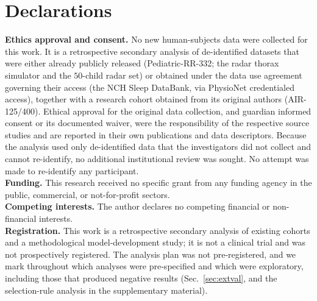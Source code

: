\documentclass[journal]{IEEEtran}
\begin{document}
\section*{Declarations}
\noindent\textbf{Ethics approval and consent.} No new human-subjects data were collected for this work. It
is a retrospective secondary analysis of de-identified datasets that were either already publicly released
(Pediatric-RR-332; the radar thorax simulator and the $50$-child radar set) or obtained under the data use
agreement governing their access (the NCH Sleep DataBank, via PhysioNet credentialed access), together with
a research cohort obtained from its original authors (AIR-125/400). Ethical approval for the original data
collection, and guardian informed consent or its documented waiver, were the responsibility of the
respective source studies and are reported in their own publications and data descriptors. Because the
analysis used only de-identified data that the investigators did not collect and cannot re-identify, no
additional institutional review was sought. No attempt was made to re-identify any participant.\\
\noindent\textbf{Funding.} This research received no specific grant from any funding agency in the public,
commercial, or not-for-profit sectors.\\
\noindent\textbf{Competing interests.} The author declares no competing financial or non-financial
interests.\\
\noindent\textbf{Registration.} This work is a retrospective secondary analysis of existing cohorts and a
methodological model-development study; it is not a clinical trial and was not prospectively registered.
The analysis plan was not pre-registered, and we mark throughout which analyses were pre-specified and
which were exploratory, including those that produced negative results
(Sec.~\ref{sec:extval}, and the selection-rule analysis in the supplementary material).



\end{document}
